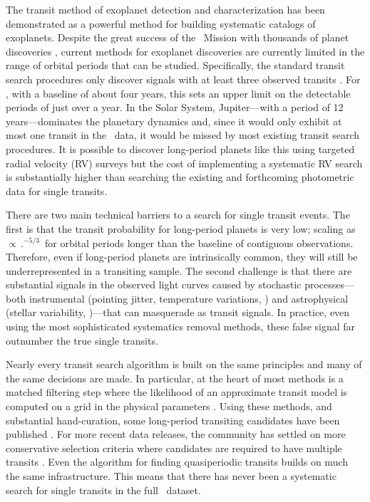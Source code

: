 The transit method of exoplanet detection and characterization has been
demonstrated as a powerful method for building systematic catalogs of
exoplanets.
Despite the great success of the \kepler\ Mission with thousands of planet
discoveries \citep{Burke:2014}, current methods for exoplanet discoveries are
currently limited in the range of orbital periods that can be studied.
Specifically, the standard transit search procedures only discover signals
with at least three observed transits \citep[for example][]{Petigura:2013,
Burke:2014}.
For \kepler, with a baseline of about four years, this sets an upper limit on
the detectable periods of just over a year.
In the Solar System, Jupiter---with a period of 12 years---dominates the
planetary dynamics and, since it would only exhibit at most one transit in the
\kepler\ data, it would be missed by most existing transit search procedures.
It is possible to discover long-period planets like this using targeted radial
velocity (RV) surveys \citep[for example][]{Butler:2006, Knutson:2014} but the
cost of implementing a systematic RV search is substantially higher than
searching the existing and forthcoming photometric data for single transits.

There are two main technical barriers to a search for single transit events.
The first is that the transit probability for long-period planets is very low;
scaling as $\propto\period^{-5/3}$ for orbital periods longer than the
baseline of contiguous observations.
Therefore, even if long-period planets are intrinsically common, they will
still be underrepresented in a transiting sample.
The second challenge is that there are substantial signals in the observed
light curves caused by stochastic processes---both instrumental
(pointing jitter, temperature variations, \etc) and astrophysical (stellar
variability, \etc)---that can masquerade as transit signals.
In practice, even using the most sophisticated systematics removal methods,
these false signal far outnumber the true single transits.

Nearly every transit search algorithm is built on the same principles and many
of the same decisions are made.
In particular, at the heart of most methods is a matched filtering step where
the likelihood of an approximate transit model is computed on a grid in the
physical parameters \citep[\kepler\ Data Processing
Handbook\footnote{\url{https://archive.stsci.edu/kepler/manuals/KSCI-19081-001_Data_Processing_Handbook.pdf}};][]{%
Petigura:2013, Huang:2013, Dressing:2015, Foreman-Mackey:2015}.
Using these methods, and substantial hand-curation, some long-period
transiting candidates have been published \citep[for example][]{Batalha:2013,
Huang:2013, Kipping:2014a}.
For more recent data releases, the community has settled on more conservative
selection criteria where candidates are required to have multiple transits
\citep[for example][]{Petigura:2013, Burke:2014}.
Even the  algorithm \citep{Carter:2013} for finding
quasiperiodic transits builds on much the same infrastructure.
This means that there has never been a systematic search for single transits
in the full \kepler\ dataset.

